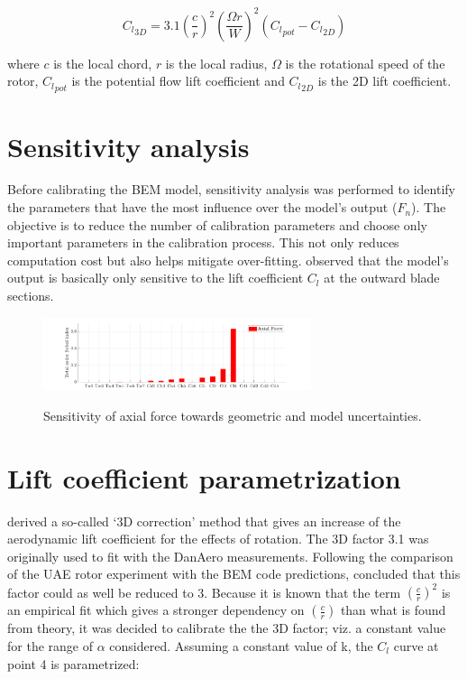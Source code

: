 \documentclass[11pt]{article}
\begin{document}
\begin{equation}
    {{}{C}_l}_{3D} = 3.1(\frac{c}{r})^2(\frac{\Omega r}{W})^2({{}{C}_l}_{pot} - {{}{C}_l}_{2D})
\end{equation}

\noindent where $c$ is the local chord, $r$ is the local radius, $\Omega$ is the rotational speed of the rotor, ${{}{C}_l}_{pot}$ is the potential flow lift coefficient and ${{}{C}_l}_{2D}$ is the 2D lift coefficient. 

\section{Sensitivity analysis}

Before calibrating the BEM model, sensitivity analysis was performed to identify the parameters that have the most influence over the model’s output ($F_n$). The objective is to reduce the number of calibration parameters and choose only important parameters in the calibration process. This not only reduces computation cost but also
helps mitigate over-fitting. \citet{torque2020} observed that the model's output is basically only sensitive to the lift coefficient $C_l$ at the outward blade sections.

\begin{figure}
\centering
\includegraphics[width=0.70\textwidth]{ Sobol.pdf}
\label{pt1}
\caption{Sensitivity of axial force towards geometric and model uncertainties.}
\end{figure}

\section{Lift coefficient parametrization}

\citet{snel} derived a so-called `3D correction’ method  that gives an increase of the aerodynamic lift coefficient for the effects of rotation. The 3D factor 3.1 was originally used to fit with the DanAero measurements. Following the comparison of the UAE rotor experiment with the BEM code predictions, \citet{UAE_exp}  concluded that this factor could
as well be reduced to 3. Because it is
known that the term $(\frac{c}{r})^2$ is an empirical fit which gives a stronger dependency on $(\frac{c}{r})$ than
what is found from theory, it was decided to calibrate the the  3D factor; viz. a constant value for the range of $\alpha$ considered. Assuming a constant value of k, the $C_l$ curve at point 4 is  parametrized:
\end{document}
